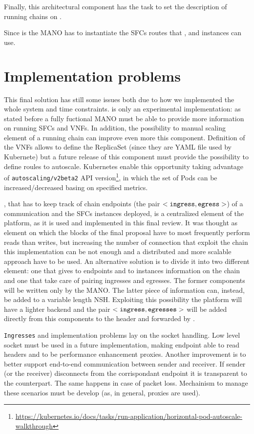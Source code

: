 Finally, this architectural component has the task to set the description of
running chains on \roulette{}.

Since \harbor{} is the MANO has to instantiate the SFCs routes that 
\ingresses{}, \egresses{} and \astaire{} instances can use. 

\section{Implementation problems}
This final solution has still some issues both due to how we implemented the
whole system and time constraints. \harbor{} is only an experimental
implementation: as stated before a fully fuctional MANO must be able to provide
more information on running SFCs and VNFs. In addition, the possibility to
manual scaling element of a running chain can improve even more this component.
Definition of the VNFs allows to define the ReplicaSet (since they are YAML
file used by Kubernete) but a future release of this component must provide
the possibility to define roules to autoscale. Kubernetes enable this
opportunity taking advantage of \texttt{autoscaling/v2beta2} API
version\footnote{\sloppy\url{https://kubernetes.io/docs/tasks/run-application/horizontal-pod-autoscale-walkthrough}},
in which the set of Pods can be increased/decreased basing on specified metrics.

\roulette{}, that has to keep track of chain endpoints (the pair $<\texttt{ingress}{},
\texttt{egress}{}>$) of a communication and the SFCs instances deployed, is a
centralized element of the platform, as it is used and implemented in this final
review. It was thought as element on which the blocks of the final proposal have
to most frequently perform reads than writes, but increasing the number of
connection that exploit the chain this implementation can be not enough and a
distributed and more scalable approach have to be used. An alternative solution
is to divide it into two different element: one that gives to endpoints and to 
\astaire{} instances information on the chain and one that take care of pairing
ingresses and egresses. The former components will be written only by the MANO.
The latter piece of information can, instead, be added to a variable length NSH.
Exploiting this possibility the platform will have a lighter backend and the
pair $<\texttt{ingress}{}, \texttt{egresses}{}>$ will be added directly from this components to
the header and forwarded by \astaire{}. 

\texttt{Ingresses} and \egresses{} implementation problems lay on the socket
handling. Low level socket must be used in a future implementation, making
endpoint able to read headers and to be performance enhancement proxies. Another
improvement is to better support end-to-end communication between sender and
receiver. If sender (or the receiver) disconnects from the corrispondant
endpoint it is transparent to the counterpart. The same happens in case of
packet loss. Mechainism to manage these scenarios must be develop (as, in
general, proxies are used).

